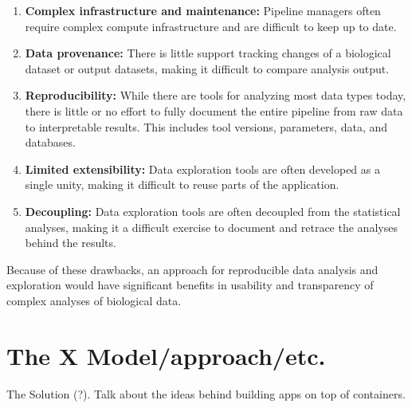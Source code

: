 \begin{enumerate}
    \item \textbf{Complex infrastructure and maintenance:} Pipeline managers
        often require complex compute infrastructure and are difficult to keep
        up to date. 
    \item \textbf{Data provenance:}  There is little support tracking changes
        of a biological dataset or output datasets, making it difficult to
        compare analysis output. 
    \item \textbf{Reproducibility:} While there are tools for analyzing most
        data types today, there is little or no effort to fully document the
        entire pipeline from raw data to interpretable results. This includes
        tool versions, parameters, data, and databases. 
    \item \textbf{Limited extensibility:} Data exploration tools are often
        developed as a single unity, making it difficult to reuse parts of the
        application.
    \item \textbf{Decoupling:} Data exploration tools are often decoupled from
        the statistical analyses, making it a difficult exercise to document and
        retrace the analyses behind the results. 
\end{enumerate} 

Because of these drawbacks, an approach for reproducible data analysis and
exploration would have significant benefits in usability and 
transparency of
complex analyses of biological data.

\section{The X Model/approach/etc.} 
    The Solution (?). Talk about the ideas behind building apps on top of
    containers.  

